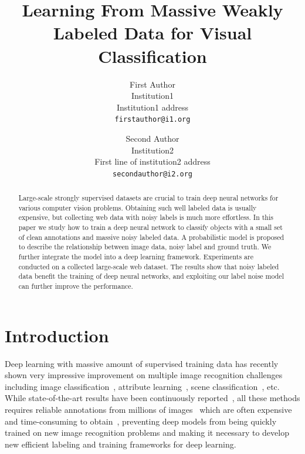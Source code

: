 \documentclass[10pt,twocolumn,letterpaper]{article}
\begin{document}

\title{Learning From Massive Weakly Labeled Data for Visual Classification}

\author{First Author\\
Institution1\\
Institution1 address\\
{\tt\small firstauthor@i1.org}
\and
Second Author\\
Institution2\\
First line of institution2 address\\
{\tt\small secondauthor@i2.org}
}

\maketitle

\begin{abstract}
Large-scale strongly supervised datasets are crucial to train deep neural networks for various computer vision problems. Obtaining such well labeled data is usually expensive, but collecting web data with noisy labels is much more effortless. In this paper we study how to train a deep neural network to classify objects with a small set of clean annotations and massive noisy labeled data. A probabilistic model is proposed to describe the relationship between image data, noisy label and ground truth. We further integrate the model into a deep learning framework. Experiments are conducted on a collected large-scale web dataset. The results show that noisy labeled data benefit the training of deep neural networks, and exploiting our label noise model can further improve the performance.
\end{abstract}

\section{Introduction} %
\label{sec:introduction}

Deep learning with massive amount of supervised training data has recently shown very impressive improvement on multiple image recognition challenges including image classification~\cite{krizhevsky2012imagenet}, attribute learning~\cite{zhang2013panda}, scene classification~\cite{farabet2013learning}, etc. While state-of-the-art results have been continuously reported~\cite{zeiler2013visualizing,simonyan2014very,szegedy2014going}, all these methods requires reliable annotations from millions of images~\cite{deng2009imagenet} which are often expensive and time-consuming to obtain~\cite{deng2009imagenet}, preventing deep models from being quickly trained on new image recognition problems and making it necessary to develop new efficient labeling and training frameworks for deep learning.
\end{document}
